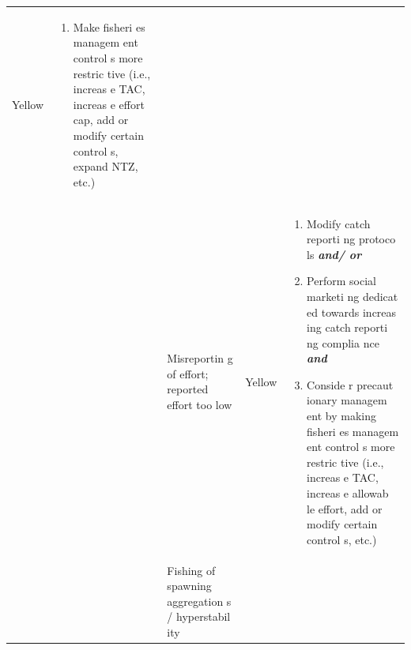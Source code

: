 \documentclass[]{book}
\providecommand{\tightlist}{%
  \setlength{\itemsep}{0pt}\setlength{\parskip}{0pt}}
\begin{document}
\begin{longtable}[]{@{}lllll@{}}
\begin{minipage}[t]{0.19\columnwidth}
Yellow\strut
\end{minipage} & \begin{minipage}[t]{0.19\columnwidth}\raggedright\strut
\begin{enumerate}
\def\labelenumi{\arabic{enumi}.}
\tightlist
\item
  Make fisheri es managem ent control s more restric tive (i.e., increas
  e TAC, increas e effort cap, add or modify certain control s, expand
  NTZ, etc.)
\end{enumerate}\strut
\end{minipage}\tabularnewline
\begin{minipage}[t]{0.19\columnwidth}\raggedright\strut
\strut
\end{minipage} & \begin{minipage}[t]{0.19\columnwidth}\raggedright\strut
\strut
\end{minipage} & \begin{minipage}[t]{0.19\columnwidth}\raggedright\strut
Misreportin g of effort; reported effort too low\strut
\end{minipage} & \begin{minipage}[t]{0.19\columnwidth}\raggedright\strut
Yellow\strut
\end{minipage} & \begin{minipage}[t]{0.19\columnwidth}\raggedright\strut
\begin{enumerate}
\def\labelenumi{\arabic{enumi}.}
\item
  Modify catch reporti ng protoco ls \textbf{\emph{and/ or}}
\item
  Perform social marketi ng dedicat ed towards increas ing catch reporti
  ng complia nce \textbf{\emph{and} }
\item
  Conside r precaut ionary managem ent by making fisheri es managem ent
  control s more restric tive (i.e., increas e TAC, increas e allowab le
  effort, add or modify certain control s, etc.)
\end{enumerate}\strut
\end{minipage}\tabularnewline
\begin{minipage}[t]{0.19\columnwidth}\raggedright\strut
\strut
\end{minipage} & \begin{minipage}[t]{0.19\columnwidth}\raggedright\strut
\strut
\end{minipage} & \begin{minipage}[t]{0.19\columnwidth}\raggedright\strut
Fishing of spawning aggregation s / hyperstabil ity\strut
\end{minipage} & \begin{minipage}[t]{0.19\columnwidth}\raggedright\strut

\end{minipage}
\end{longtable}
\end{document}
